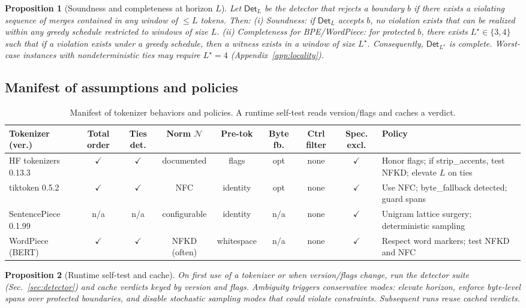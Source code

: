 \documentclass{article}
\newtheorem{proposition}{Proposition}
\begin{document}
\begin{proposition}[Soundness and completeness at horizon $L$]\label{prop:sound-complete}
Let $\mathsf{Det}_L$ be the detector that rejects a boundary $b$ if there exists a violating sequence of merges contained in any window of $\le L$ tokens. Then: (i) Soundness: if $\mathsf{Det}_L$ accepts $b$, no violation exists that can be realized within any greedy schedule restricted to windows of size $L$. (ii) Completeness for BPE/WordPiece: for protected $b$, there exists $L^\star\in\{3,4\}$ such that if a violation exists under a greedy schedule, then a witness exists in a window of size $L^\star$. Consequently, $\mathsf{Det}_{L^\star}$ is complete. Worst-case instances with nondeterministic ties may require $L^\star=4$ (Appendix~\ref{app:locality}).
\end{proposition}

\subsection{Manifest of assumptions and policies}\label{sec:manifest}
\begin{table}[H]
\centering
\small
\begin{tabular}{@{}lcccccccl@{}}
\toprule
Tokenizer (ver.) & Total order & Ties det. & Norm $\mathcal{N}$ & Pre-tok & Byte fb. & Ctrl filter & Spec. excl. & Policy \\
\midrule
HF tokenizers 0.13.3 & $\checkmark$ & $\checkmark$ & documented & flags & opt & none & $\checkmark$ & Honor flags; if strip\_accents, test NFKD; elevate $L$ on ties \\
tiktoken 0.5.2 & $\checkmark$ & $\checkmark$ & NFC & identity & opt & none & $\checkmark$ & Use NFC; byte\_fallback detected; guard spans \\
SentencePiece 0.1.99 & n/a & n/a & configurable & identity & n/a & none & $\checkmark$ & Unigram lattice surgery; deterministic sampling \\
WordPiece (BERT) & $\checkmark$ & $\checkmark$ & NFKD (often) & whitespace & n/a & none & $\checkmark$ & Respect word markers; test NFKD and NFC \\
\bottomrule
\end{tabular}
\caption{Manifest of tokenizer behaviors and policies. A runtime self-test reads version/flags and caches a verdict.}
\label{tab:manifest}
\end{table}

\begin{proposition}[Runtime self-test and cache]
On first use of a tokenizer or when version/flags change, run the detector suite (Sec.~\ref{sec:detector}) and cache verdicts keyed by version and flags. Ambiguity triggers conservative modes: elevate horizon, enforce byte-level spans over protected boundaries, and disable stochastic sampling modes that could violate constraints. Subsequent runs reuse cached verdicts.
\end{proposition}
\end{document}
